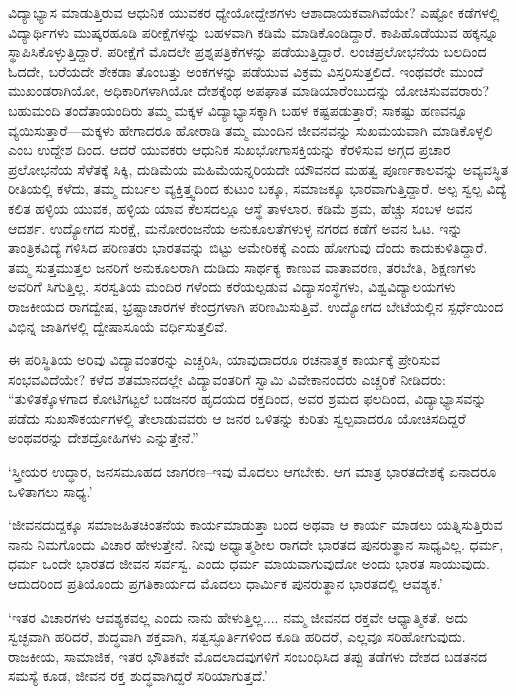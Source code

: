 ವಿದ್ಯಾಭ್ಯಾಸ ಮಾಡುತ್ತಿರುವ ಆಧುನಿಕ ಯುವಕರ ಧ್ಯೇಯೋದ್ದೇಶಗಳು ಆಶಾದಾಯಕ\-ವಾಗಿವೆಯೇ? ಎಷ್ಟೋ ಕಡೆಗಳಲ್ಲಿ ವಿದ್ಯಾರ್ಥಿಗಳು ಮುಷ್ಕರಹೂಡಿ ಪರೀಕ್ಷೆಗಳನ್ನು ಬಹಳವಾಗಿ ಕಡಿಮೆ ಮಾಡಿ\-ಕೊಂಡಿ\-ದ್ದಾರೆ. ಕಾಪಿಹೊಡೆಯುವ ಹಕ್ಕನ್ನೂ ಸ್ಥಾಪಿಸಿಕೊಳ್ಳುತ್ತಿದ್ದಾರೆ. ಪರೀಕ್ಷೆಗೆ ಮೊದಲೇ ಪ್ರಶ್ನಪತ್ರಿಕೆಗಳನ್ನು ಪಡೆಯುತ್ತಿದ್ದಾರೆ. ಲಂಚಪ್ರಲೋಭನೆಯ ಬಲದಿಂದ ಓದದೇ, ಬರೆಯದೇ ಶೇಕಡಾ ತೊಂಬತ್ತು ಅಂಕಗಳನ್ನು ಪಡೆಯುವ ವಿಕ್ರಮ ವಿಸ್ತರಿಸುತ್ತಲಿದೆ. ಇಂಥವರೇ ಮುಂದೆ ಮುಖಂಡರಾಗಿಯೋ, ಅಧಿಕಾರಿಗಳಾಗಿಯೋ ದೇಶಕ್ಕೆಂಥ ಅಪಘಾತ ಮಾಡಿಯಾರೆಂಬು\-ದನ್ನು ಯೋಚಿಸುವವರಾರು? ಬಹುಮಂದಿ ತಂದೆತಾಯಂದಿರು ತಮ್ಮ ಮಕ್ಕಳ ವಿದ್ಯಾಭ್ಯಾಸ\-ಕ್ಕಾಗಿ ಬಹಳ ಕಷ್ಟಪಡುತ್ತಾರೆ; ಸಾಕಷ್ಟು ಹಣವನ್ನೂ ವ್ಯಯಿಸುತ್ತಾರೆ—ಮಕ್ಕಳು ಹೇಗಾದರೂ ಹೋರಾಡಿ ತಮ್ಮ ಮುಂದಿನ ಜೀವನವನ್ನು ಸುಖಮಯವಾಗಿ ಮಾಡಿಕೊಳ್ಳಲಿ ಎಂಬ ಉದ್ದೇಶ ದಿಂದ. ಆದರೆ ಯುವಕರು ಆಧುನಿಕ ಸುಖಭೋಗಾಸಕ್ತಿಯನ್ನು ಕೆರಳಿಸುವ ಅಗ್ಗದ ಪ್ರಚಾರ ಪ್ರಲೋಭನೆಯ ಸೆಳೆತಕ್ಕೆ ಸಿಕ್ಕಿ, ದುಡಿಮೆಯ ಮಹಿಮೆಯನ್ನರಿಯದೇ ಯೌವನದ ಮಹತ್ವ ಪೂರ್ಣಕಾಲವನ್ನು ಅವ್ಯವಸ್ಥಿತ ರೀತಿಯಲ್ಲಿ ಕಳೆದು, ತಮ್ಮ ದುರ್ಬಲ ವ್ಯಕ್ತಿತ್ತ್ವದಿಂದ ಕುಟುಂ ಬಕ್ಕೂ, ಸಮಾಜಕ್ಕೂ ಭಾರವಾಗುತ್ತಿದ್ದಾರೆ. ಅಲ್ಪ ಸ್ವಲ್ಪ ವಿದ್ಯೆ ಕಲಿತ ಹಳ್ಳಿಯ ಯುವಕ, ಹಳ್ಳಿಯ ಯಾವ ಕೆಲಸದಲ್ಲೂ ಆಸ್ಥೆ ತಾಳಲಾರ. ಕಡಿಮೆ ಶ್ರಮ, ಹೆಚ್ಚು ಸಂಬಳ ಅವನ ಆದರ್ಶ. ಉದ್ಯೋಗದ ಸುರಕ್ಷೆ, ಮನೋರಂಜನೆಯ ಅನುಕೂಲತೆಗಳುಳ್ಳ ನಗರದ ಕಡೆಗೆ ಅವನ ಓಟ. ಇನ್ನು ತಾಂತ್ರಿಕವಿದ್ಯೆ ಗಳಿಸಿದ ಪರಿಣತರು ಭಾರತವನ್ನು ಬಿಟ್ಟು ಅಮೇರಿಕಕ್ಕೆ ಎಂದು ಹೋಗುವು ದೆಂದು ಕಾದುಕುಳಿತಿದ್ದಾರೆ. ತಮ್ಮ ಸುತ್ತಮುತ್ತಲ ಜನರಿಗೆ ಅನುಕೂಲರಾಗಿ ದುಡಿದು ಸಾರ್ಥಕ್ಯ ಕಾಣುವ ವಾತಾವರಣ, ತರಬೇತಿ, ಶಿಕ್ಷಣಗಳು ಅವರಿಗೆ ಸಿಗುತ್ತಿಲ್ಲ. ಸರಸ್ವತಿಯ ಮಂದಿರ ಗಳೆಂದು ಕರೆಯಲ್ಪಡುವ ವಿದ್ಯಾಸಂಸ್ಥೆಗಳು, ವಿಶ್ವವಿದ್ಯಾಲಯಗಳು ರಾಜಕೀಯದ ರಾಗದ್ವೇಷ, ಭ್ರಷ್ಟಾಚಾರಗಳ ಕೇಂದ್ರಗಳಾಗಿ ಪರಿಣಮಿಸುತ್ತಿವೆ. ಉದ್ಯೋಗದ ಬೇಟೆಯಲ್ಲಿನ ಸ್ಪರ್ಧೆಯಿಂದ ವಿಭಿನ್ನ ಜಾತಿಗಳಲ್ಲಿ ದ್ವೇಷಾಸೂಯೆ ವರ್ಧಿಸುತ್ತಲಿವೆ.

ಈ ಪರಿಸ್ಥಿತಿಯ ಅರಿವು ವಿದ್ಯಾವಂತರನ್ನು ಎಚ್ಚರಿಸಿ, ಯಾವುದಾದರೂ ರಚನಾತ್ಮಕ ಕಾರ್ಯಕ್ಕೆ ಪ್ರೇರಿಸುವ ಸಂಭವವಿದೆಯೇ? ಕಳೆದ ಶತಮಾನದಲ್ಲೇ ವಿದ್ಯಾವಂತರಿಗೆ ಸ್ವಾಮಿ ವಿವೇಕಾನಂದರು ಎಚ್ಚರಿಕೆ ನೀಡಿದರು: “ತುಳಿತಕ್ಕೊಳಗಾದ ಕೋಟಿಗಟ್ಟಲೆ ಬಡಜನರ ಹೃದಯದ ರಕ್ತದಿಂದ, ಅವರ ಶ್ರಮದ ಫಲದಿಂದ, ವಿದ್ಯಾಭ್ಯಾಸವನ್ನು ಪಡೆದು ಸುಖಸೌಕರ್ಯಗಳಲ್ಲಿ ತೇಲಾಡುವವರು ಆ ಜನರ ಒಳಿತನ್ನು ಕುರಿತು ಸ್ವಲ್ಪವಾದರೂ ಯೋಚಿಸದಿದ್ದರೆ ಅಂಥವರನ್ನು ದೇಶದ್ರೋಹಿಗಳು ಎನ್ನುತ್ತೇನೆ.”

‘ಸ್ತ್ರೀಯರ ಉದ್ಧಾರ, ಜನಸಮೂಹದ ಜಾಗರಣ–ಇವು ಮೊದಲು ಆಗಬೇಕು. ಆಗ ಮಾತ್ರ ಭಾರತದೇಶಕ್ಕೆ ಏನಾದರೂ ಒಳಿತಾಗಲು ಸಾಧ್ಯ.’

‘ಜೀವನದುದ್ದಕ್ಕೂ ಸಮಾಜಹಿತಚಿಂತನೆಯ ಕಾರ್ಯಮಾಡುತ್ತಾ ಬಂದ ಅಥವಾ ಆ ಕಾರ್ಯ ಮಾಡಲು ಯತ್ನಿಸುತ್ತಿರುವ ನಾನು ನಿಮಗೊಂದು ವಿಚಾರ ಹೇಳುತ್ತೇನೆ. ನೀವು ಅಧ್ಯಾತ್ಮಶೀಲ ರಾಗದೇ ಭಾರತದ ಪುನರುತ್ಥಾನ ಸಾಧ್ಯವಿಲ್ಲ. ಧರ್ಮ, ಧರ್ಮ ಒಂದೇ ಭಾರತದ ಜೀವನ ಸರ್ವಸ್ವ. ಎಂದು ಧರ್ಮ ಮಾಯವಾಗುವುದೋ ಅಂದು ಭಾರತ ಸಾಯುವುದು. ಆದುದರಿಂದ ಪ್ರತಿಯೊಂದು ಪ್ರಗತಿಕಾರ್ಯದ ಮೊದಲು ಧಾರ್ಮಿಕ ಪುನರುತ್ಥಾನ ಭಾರತದಲ್ಲಿ ಆವಶ್ಯಕ.’

‘ಇತರ ವಿಚಾರಗಳು ಆವಶ್ಯಕವಲ್ಲ ಎಂದು ನಾನು ಹೇಳುತ್ತಿಲ್ಲ.... ನಮ್ಮ ಜೀವನದ ರಕ್ತವೇ ಆಧ್ಯಾತ್ಮಿಕತೆ. ಅದು ಸ್ವಚ್ಛವಾಗಿ ಹರಿದರೆ, ಶುದ್ಧವಾಗಿ ಶಕ್ತವಾಗಿ, ಸತ್ವಸ್ಫೂರ್ತಿಗಳಿಂದ ಕೂಡಿ ಹರಿದರೆ, ಎಲ್ಲವೂ ಸರಿಹೋಗುವುದು. ರಾಜಕೀಯ, ಸಾಮಾಜಿಕ, ಇತರ ಭೌತಿಕವೇ ಮೊದಲಾದವುಗಳಿಗೆ ಸಂಬಂಧಿಸಿದ ತಪ್ಪು ತಡೆಗಳು ದೇಶದ ಬಡತನದ ಸಮಸ್ಯೆ ಕೂಡ, ಜೀವನ ರಕ್ತ ಶುದ್ಧವಾಗಿದ್ದರೆ ಸರಿಯಾಗುತ್ತದೆ.’

